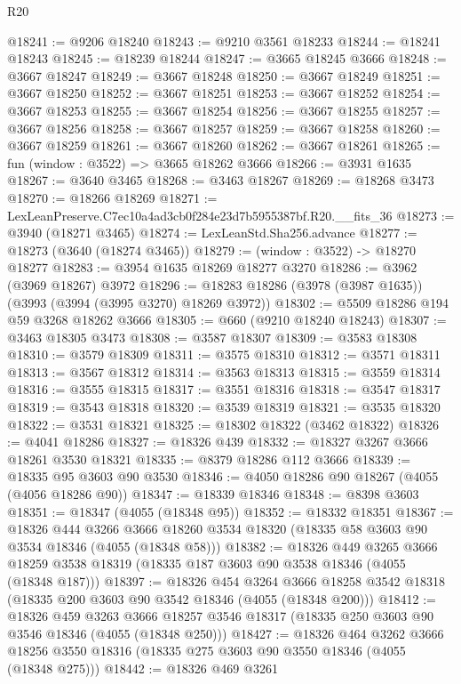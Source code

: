 \begin{lexlean}{R20}
\begin{coremodule}
@18241 := @9206 @18240
@18243 := @9210 @3561 @18233
@18244 := @18241 @18243
@18245 := @18239 @18244
@18247 := @3665 @18245 @3666
@18248 := @3667 @18247
@18249 := @3667 @18248
@18250 := @3667 @18249
@18251 := @3667 @18250
@18252 := @3667 @18251
@18253 := @3667 @18252
@18254 := @3667 @18253
@18255 := @3667 @18254
@18256 := @3667 @18255
@18257 := @3667 @18256
@18258 := @3667 @18257
@18259 := @3667 @18258
@18260 := @3667 @18259
@18261 := @3667 @18260
@18262 := @3667 @18261
@18265 := fun (window : @3522) => @3665 @18262 @3666
@18266 := @3931 @1635
@18267 := @3640 @3465
@18268 := @3463 @18267
@18269 := @18268 @3473
@18270 := @18266 @18269
@18271 := LexLeanPreserve.C7ec10a4ad3cb0f284e23d7b5955387bf.R20.__fits_36
@18273 := @3940 (@18271 @3465)
@18274 := LexLeanStd.Sha256.advance
@18277 := @18273 (@3640 (@18274 @3465))
@18279 := (window : @3522) -> @18270 @18277
@18283 := @3954 @1635 @18269 @18277 @3270
@18286 := @3962 (@3969 @18267) @3972
@18296 := @18283 @18286 (@3978 (@3987 @1635)) (@3993 (@3994 (@3995 @3270) @18269 @3972))
@18302 := @5509 @18286 @194 @59 @3268 @18262 @3666
@18305 := @660 (@9210 @18240 @18243)
@18307 := @3463 @18305 @3473
@18308 := @3587 @18307
@18309 := @3583 @18308
@18310 := @3579 @18309
@18311 := @3575 @18310
@18312 := @3571 @18311
@18313 := @3567 @18312
@18314 := @3563 @18313
@18315 := @3559 @18314
@18316 := @3555 @18315
@18317 := @3551 @18316
@18318 := @3547 @18317
@18319 := @3543 @18318
@18320 := @3539 @18319
@18321 := @3535 @18320
@18322 := @3531 @18321
@18325 := @18302 @18322 (@3462 @18322)
@18326 := @4041 @18286
@18327 := @18326 @439
@18332 := @18327 @3267 @3666 @18261 @3530 @18321
@18335 := @8379 @18286 @112 @3666
@18339 := @18335 @95 @3603 @90 @3530
@18346 := @4050 @18286 @90 @18267 (@4055 (@4056 @18286 @90))
@18347 := @18339 @18346
@18348 := @8398 @3603
@18351 := @18347 (@4055 (@18348 @95))
@18352 := @18332 @18351
@18367 := @18326
    @444
    @3266
    @3666
    @18260
    @3534
    @18320
    (@18335 @58 @3603 @90 @3534 @18346 (@4055 (@18348 @58)))
@18382 := @18326
    @449
    @3265
    @3666
    @18259
    @3538
    @18319
    (@18335 @187 @3603 @90 @3538 @18346 (@4055 (@18348 @187)))
@18397 := @18326
    @454
    @3264
    @3666
    @18258
    @3542
    @18318
    (@18335 @200 @3603 @90 @3542 @18346 (@4055 (@18348 @200)))
@18412 := @18326
    @459
    @3263
    @3666
    @18257
    @3546
    @18317
    (@18335 @250 @3603 @90 @3546 @18346 (@4055 (@18348 @250)))
@18427 := @18326
    @464
    @3262
    @3666
    @18256
    @3550
    @18316
    (@18335 @275 @3603 @90 @3550 @18346 (@4055 (@18348 @275)))
@18442 := @18326
    @469
    @3261

\end{coremodule}
\end{lexlean}
